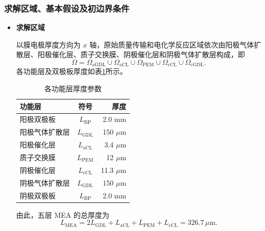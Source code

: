 \documentclass[bwprint]{gmcmthesis}
\numberwithin{figure}{section}
\begin{document}
\subsubsection{求解区域、基本假设及初边界条件}
\begin{itemize}
\renewcommand{\labelitemi}{$\blacktriangleright$}
\item \textbf {求解区域}

以膜电极厚度方向为 $x$ 轴，原始质量传输和电化学反应区域依次由阳极气体扩散层、阳极催化层、质子交换膜、阴极催化层和阴极气体扩散层构成，即
\begin{equation}
\Omega = \Omega_{\text{aGDL}} \cup \Omega_{\text{aCL}} \cup \Omega_{\text{PEM}} \cup \Omega_{\text{cCL}} \cup \Omega_{\text{cGDL}}.
\tag{4-1}
\end{equation}
各功能层及双极板厚度如表\ref{B4-1}所示。

\begin{table}[htbp]
    \centering
    \caption{各功能层厚度参数}
    \label{B4-1}
    \setlength{\tabcolsep}{24pt}  %
    \renewcommand{\arraystretch}{1.5} %
    
    \begin{tabular}{l c r} %
        \toprule
        \textbf{功能层} & \textbf{符号} & \textbf{厚度} \\
        \midrule
        阳极双极板       & \(L_{\text{BP}}\)  & 2.0 mm     \\
        阳极气体扩散层   & \(L_{\text{GDL}}\) & 150 \(\mu\)m \\
        阳极催化层       & \(L_{\text{aCL}}\) & 3.4 \(\mu\)m \\
        质子交换膜       & \(L_{\text{PEM}}\) & 12 \(\mu\)m  \\
        阴极催化层       & \(L_{\text{cCL}}\) & 11.3 \(\mu\)m \\
        阴极气体扩散层   & \(L_{\text{GDL}}\) & 150 \(\mu\)m \\
        阴极双极板       & \(L_{\text{BP}}\)  & 2.0 mm     \\
        \bottomrule
    \end{tabular}
\end{table}

 由此，五层 MEA 的总厚度为
\begin{equation}
L_{\text{MEA}} = 2L_{\text{GDL}} + L_{\text{aCL}} + L_{\text{PEM}} + L_{\text{cCL}} = 326.7 \, \mu\text{m}.
\tag{4-2}
\end{equation}


\end{itemize}
\end{document}
